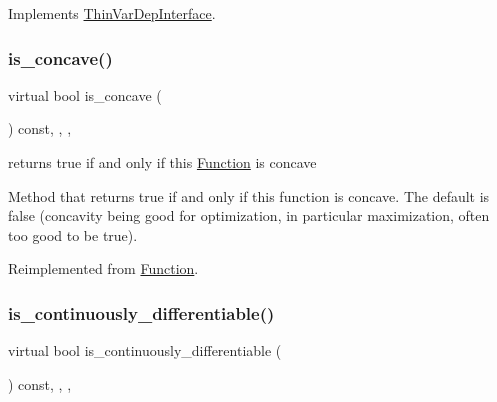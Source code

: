 Implements \mbox{\hyperlink{group___thin_var_dep_interface___c_l_a_s_s_e_s_ga05297a4e506f89ec692a01aca971ce2d}{Thin\+Var\+Dep\+Interface}}.

\mbox{\label{class_s_m_spp__di__unipi__it_1_1_linear_function_ac5169a9ee09d66d4e9078d0350ea9142}} 
\subsubsection{\texorpdfstring{is\+\_\+concave()}{is\_concave()}}
{\footnotesize\ttfamily virtual bool is\+\_\+concave (\begin{DoxyParamCaption}\item[{void}]{ }\end{DoxyParamCaption}) const\hspace{0.3cm}{\ttfamily [inline]}, {\ttfamily [final]}, {\ttfamily [override]}, {\ttfamily [virtual]}}



returns true if and only if this \mbox{\hyperlink{class_s_m_spp__di__unipi__it_1_1_function}{Function}} is concave 

Method that returns true if and only if this function is concave. The default is false (concavity being good for optimization, in particular maximization, often too good to be true). 

Reimplemented from \mbox{\hyperlink{class_s_m_spp__di__unipi__it_1_1_function_a123711e22aabb119629862cf3cb791de}{Function}}.

\mbox{\label{class_s_m_spp__di__unipi__it_1_1_linear_function_ae8dc9a7225895704afe3802754f4fd75}} 
\subsubsection{\texorpdfstring{is\+\_\+continuously\+\_\+differentiable()}{is\_continuously\_differentiable()}}
{\footnotesize\ttfamily virtual bool is\+\_\+continuously\+\_\+differentiable (\begin{DoxyParamCaption}\item[{void}]{ }\end{DoxyParamCaption}) const\hspace{0.3cm}{\ttfamily [inline]}, {\ttfamily [final]}, {\ttfamily [override]}, {\ttfamily [virtual]}}



